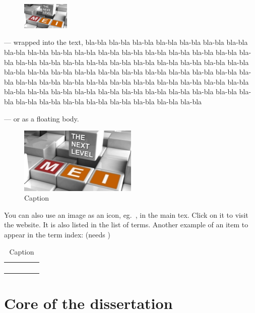 \documentclass[
  oneside,
  11pt, a4paper,
  footinclude=true,
  headinclude=true,
  cleardoublepage=empty
]{scrbook}
\begin{document}
\begin{figure}	
	\includegraphics[width=0.2\textwidth]{img/mei-logo-03.jpg}
\end{figure}
\noindent --- wrapped into the text,
bla-bla bla-bla bla-bla bla-bla bla-bla bla-bla bla-bla bla-bla bla-bla bla-bla
bla-bla bla-bla bla-bla bla-bla bla-bla bla-bla bla-bla bla-bla bla-bla bla-bla
bla-bla bla-bla bla-bla bla-bla bla-bla bla-bla bla-bla bla-bla bla-bla bla-bla
bla-bla bla-bla bla-bla bla-bla bla-bla bla-bla bla-bla bla-bla bla-bla bla-bla
bla-bla bla-bla bla-bla bla-bla bla-bla bla-bla bla-bla bla-bla bla-bla bla-bla bla-bla bla-bla bla-bla bla-bla
bla-bla bla-bla bla-bla bla-bla bla-bla bla-bla bla-bla bla-bla bla-bla bla-bla bla-bla bla-bla bla-bla bla-bla

\noindent --- or as a floating body.
\begin{figure}
\begin{center}
	\includegraphics[width=0.5\textwidth]{img/mei-logo-03.jpg}
\end{center}
\caption{Caption}
\end{figure}

You can also use an image as an icon, eg.\ \MEI, in the main tex.
Click on it to visit the website. It is also listed in the list of terms.
Another example of an item to appear in the term index: \UM (needs \Makeindex)

\begin{table}[]
\begin{tabular}{lllll}
 &  &  &  &  \\
 &  &  &  &  \\
 &  &  &  &  \\
 &  &  &  & 
\end{tabular}
\caption{Caption}
\end{table}

\part{Core of the dissertation}
\end{document}
